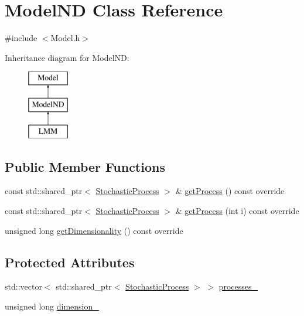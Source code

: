 \hypertarget{class_model_n_d}{}\section{Model\+ND Class Reference}
\label{class_model_n_d}


{\ttfamily \#include $<$Model.\+h$>$}

Inheritance diagram for Model\+ND\+:\begin{figure}[H]
\begin{center}
\leavevmode
\includegraphics[height=3.000000cm]{class_model_n_d}
\end{center}
\end{figure}
\subsection*{Public Member Functions}
\begin{DoxyCompactItemize}
\item 
const std\+::shared\+\_\+ptr$<$ \hyperlink{class_stochastic_process}{Stochastic\+Process} $>$ \& \hyperlink{class_model_n_d_a98976fe73a8895ff98ba60ea174232f8}{get\+Process} () const override
\item 
const std\+::shared\+\_\+ptr$<$ \hyperlink{class_stochastic_process}{Stochastic\+Process} $>$ \& \hyperlink{class_model_n_d_a62866814432b7c0a0d8f58223cc6279d}{get\+Process} (int i) const override
\item 
unsigned long \hyperlink{class_model_n_d_ab2356536a38f4961257654de629d6093}{get\+Dimensionality} () const override
\end{DoxyCompactItemize}
\subsection*{Protected Attributes}
\begin{DoxyCompactItemize}
\item 
std\+::vector$<$ std\+::shared\+\_\+ptr$<$ \hyperlink{class_stochastic_process}{Stochastic\+Process} $>$ $>$ \hyperlink{class_model_n_d_a9cb778073c54caae0ffea17a59a9a2f9}{processes\+\_\+}
\item 
unsigned long \hyperlink{class_model_n_d_ac86872437daeeffeb8fb1b387bea28f8}{dimension\+\_\+}
\end{DoxyCompactItemize}


